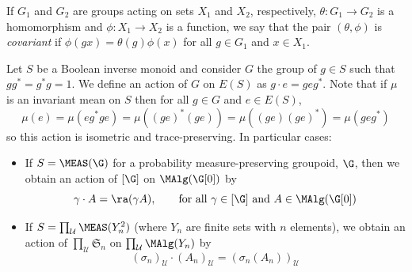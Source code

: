 If $G_1$ and $G_2$ are groups acting on sets $X_1$ and $X_2$, respectively, $\theta:G_1\to G_2$ is a homomorphism and $\phi:X_1\to X_2$ is a function, we say that the pair $(\theta,\phi)$ is \emph{covariant} if $\phi(g x)=\theta(g)\phi(x)$ for all $g\in G_1$ and $x\in X_1$.

Let $S$ be a Boolean inverse monoid and consider $G$ the group of $g\in S$ such that $gg^*=g^*g=1$. We define an action of $G$ on $E(S)$ as $g\cdot e=geg^*$. Note that if $\mu$ is an invariant mean on $S$ then for all $g\in G$ and $e\in E(S)$,
\[\mu(e)=\mu(eg^*ge)=\mu((ge)^*(ge))=\mu((ge)(ge)^*)=\mu(geg^*)\]
so this action is isometric and trace-preserving. In particular cases:
\begin{itemize}
\item If $S=\MEAS(\G)$ for a probability measure-preserving groupoid, $\G$, then we obtain an action of $[\G]$ on $\MAlg(\G[0])$ by
\[\gamma\cdot A=\ra(\gamma A),\qquad\text{for all }\gamma\in[\G]\text{ and }A\in\MAlg(\G[0])\]
\item If $S=\prod_\mathcal{U}\MEAS(Y_n^2)$ (where $Y_n$ are finite sets with $n$ elements), we obtain an action of $\prod_\mathcal{U}\mathfrak{S}_n$ on $\prod_\mathcal{U}\MAlg(Y_n)$ by
\[\left(\sigma_n\right)_\mathcal{U}\cdot\left(A_n\right)_\mathcal{U}=\left(\sigma_n(A_n)\right)_\mathcal{U}\]
\end{itemize}

